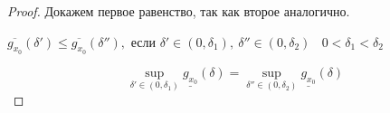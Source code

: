 \begin{proof}
    Докажем первое равенство, так как второе аналогично.
\begin{center}
    $ \overline{g_{x_{0}}}(\delta') \leq \overline{g_{x_{0}}}(\delta''),$ если $\delta' \in (0, \delta_{1}),\  \delta'' \in (0, \delta_{2}) \ \ \ \ 0 < \delta_{1} < \delta_{2}$
\end{center}
    $$
        \underset{\delta' \in (0, \delta_{1}) }{\sup} \underline{g_{x_{0}}}(\delta) = \underset{\delta'' \in (0, \delta_{2}) }{\sup} \underline{g_{x_{0}}}(\delta)
    $$
\end{proof}

